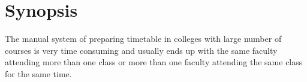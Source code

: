 %
%
%
%

%
%

%
%
%
%
%
%
%
%
%
%
%
%
%
%
%
% 
%
%
% 
%
%
%
%
%
%
%
%

%
%
%
\chapter*{Synopsis}
%

          The manual system of preparing timetable in colleges with large number of courses is very time consuming and usually ends up with the same faculty attending more than one class or more than one faculty attending the same class for the same time.


